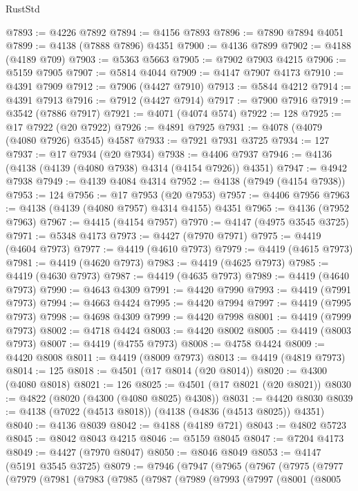 \begin{lexlean}{RustStd}
\begin{coremodule}
@7893 := @4226 @7892
@7894 := @4156 @7893
@7896 := @7890 @7894 @4051
@7899 := @4138 (@7888 @7896) @4351
@7900 := @4136 @7899
@7902 := @4188 (@4189 @709)
@7903 := @5363 @5663
@7905 := @7902 @7903 @4215
@7906 := @5159 @7905
@7907 := @5814 @4044
@7909 := @4147 @7907 @4173
@7910 := @4391 @7909
@7912 := @7906 (@4427 @7910)
@7913 := @5844 @4212
@7914 := @4391 @7913
@7916 := @7912 (@4427 @7914)
@7917 := @7900 @7916
@7919 := @3542 (@7886 @7917)
@7921 := @4071 (@4074 @574)
@7922 := 128
@7925 := @17 @7922 (@20 @7922)
@7926 := @4891 @7925
@7931 := @4078 (@4079 (@4080 @7926) @3545) @4587
@7933 := @7921 @7931 @3725
@7934 := 127
@7937 := @17 @7934 (@20 @7934)
@7938 := @4406 @7937
@7946 := @4136 (@4138 (@4139 (@4080 @7938) @4314 (@4154 @7926)) @4351)
@7947 := @4942 @7938
@7949 := @4139 @4084 @4314
@7952 := @4138 (@7949 (@4154 @7938))
@7953 := 124
@7956 := @17 @7953 (@20 @7953)
@7957 := @4406 @7956
@7963 := @4138 (@4139 (@4080 @7957) @4314 @4155) @4351
@7965 := @4136 (@7952 @7963)
@7967 := @4415 (@4154 @7957)
@7970 := @4147 (@4975 @3545 @3725)
@7971 := @5348 @4173
@7973 := @4427 (@7970 @7971)
@7975 := @4419 (@4604 @7973)
@7977 := @4419 (@4610 @7973)
@7979 := @4419 (@4615 @7973)
@7981 := @4419 (@4620 @7973)
@7983 := @4419 (@4625 @7973)
@7985 := @4419 (@4630 @7973)
@7987 := @4419 (@4635 @7973)
@7989 := @4419 (@4640 @7973)
@7990 := @4643 @4309
@7991 := @4420 @7990
@7993 := @4419 (@7991 @7973)
@7994 := @4663 @4424
@7995 := @4420 @7994
@7997 := @4419 (@7995 @7973)
@7998 := @4698 @4309
@7999 := @4420 @7998
@8001 := @4419 (@7999 @7973)
@8002 := @4718 @4424
@8003 := @4420 @8002
@8005 := @4419 (@8003 @7973)
@8007 := @4419 (@4755 @7973)
@8008 := @4758 @4424
@8009 := @4420 @8008
@8011 := @4419 (@8009 @7973)
@8013 := @4419 (@4819 @7973)
@8014 := 125
@8018 := @4501 (@17 @8014 (@20 @8014))
@8020 := @4300 (@4080 @8018)
@8021 := 126
@8025 := @4501 (@17 @8021 (@20 @8021))
@8030 := @4822 (@8020 (@4300 (@4080 @8025) @4308))
@8031 := @4420 @8030
@8039 := @4138 (@7022 (@4513 @8018)) (@4138 (@4836 (@4513 @8025)) @4351)
@8040 := @4136 @8039
@8042 := @4188 (@4189 @721)
@8043 := @4802 @5723
@8045 := @8042 @8043 @4215
@8046 := @5159 @8045
@8047 := @7204 @4173
@8049 := @4427 (@7970 @8047)
@8050 := @8046 @8049
@8053 := @4147 (@5191 @3545 @3725)
@8079 := @7946
    (@7947
      (@7965
        (@7967
          (@7975
            (@7977
              (@7979
                (@7981
                  (@7983
                    (@7985
                      (@7987
                        (@7989
                          (@7993
                            (@7997
                              (@8001
                                (@8005

\end{coremodule}
\end{lexlean}
